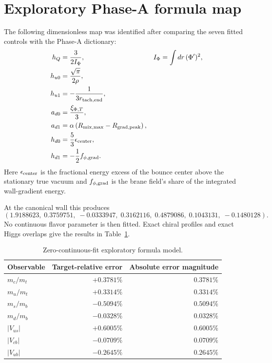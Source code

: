\documentclass[11pt]{article}
\begin{document}
\section{Exploratory Phase-A formula map}
The following dimensionless map was identified after comparing the seven fitted controls with the Phase-A dictionary:
\begin{align}
h_Q&=\frac{3}{2I_\Phi},
&I_\Phi&=\int dr\,(\Phi')^2,\\
h_{u0}&=\frac{\sqrt\pi}{2\rho},\\
h_{u1}&=-\frac{1}{3r_{\rm tach,end}},\\
a_{d0}&=\frac{\xi_{\Phi,T}}{3},\\
a_{d1}&=\alpha\left(R_{\rm mix,max}-R_{\rm grad,peak}\right),\\
h_{d0}&=\frac{5}{3}\epsilon_{\rm center},\\
h_{d1}&=-\frac12 f_{\phi,\rm grad}.
\end{align}
Here $\epsilon_{\rm center}$ is the fractional energy excess of the bounce center above the stationary true vacuum and $f_{\phi,\rm grad}$ is the brane field's share of the integrated wall-gradient energy.

At the canonical wall this produces
\begin{equation}
(1.9188623,\;0.3759751,\;-0.0333947,\;0.3162116,\;0.4879086,\;0.1043131,\;-0.1480128).
\end{equation}
No continuous flavor parameter is then fitted.  Exact chiral profiles and exact Higgs overlaps give the results in Table~\ref{tab:zero-fit}.

\begin{table}[h]
\centering
\caption{Zero-continuous-fit exploratory formula model.}
\label{tab:zero-fit}
\begin{tabular}{lrr}
\toprule
Observable & Target-relative error & Absolute error magnitude\\
\midrule
$m_c/m_t$ & $+0.3781\%$ & $0.3781\%$\\
$m_u/m_t$ & $+0.3314\%$ & $0.3314\%$\\
$m_s/m_b$ & $-0.5094\%$ & $0.5094\%$\\
$m_d/m_b$ & $-0.0328\%$ & $0.0328\%$\\
$|V_{us}|$ & $+0.6005\%$ & $0.6005\%$\\
$|V_{cb}|$ & $-0.0709\%$ & $0.0709\%$\\
$|V_{ub}|$ & $-0.2645\%$ & $0.2645\%$\\
\bottomrule
\end{tabular}
\end{table}
\end{document}

